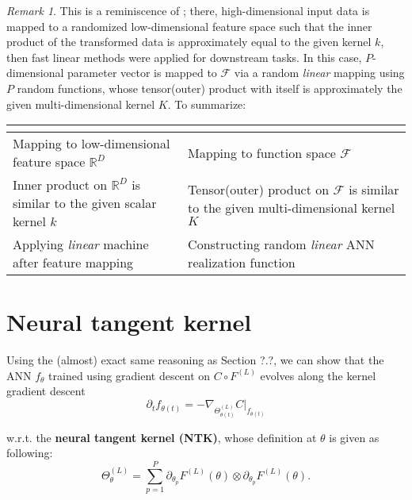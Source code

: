 \documentclass{article}
\theoremstyle{plain}
\theoremstyle{definition}
\theoremstyle{remark}
\newtheorem{remark}{Remark}
\begin{document}
\begin{remark}
	This is a reminiscence of \cite{Rahimi-Recht}; there, high-dimensional input data is mapped to a randomized low-dimensional feature space such that the inner product of the transformed data is approximately equal to the given kernel $k$, then fast linear methods were applied for downstream tasks.
	In this case, $P$-dimensional parameter vector is mapped to $\mathcal{F}$ via a random {\it linear} mapping using $P$ random functions, whose tensor(outer) product with itself is approximately the given multi-dimensional kernel $K$.
	To summarize:
	\begin{center}
		\begin{tabular}{ | p{8cm} | p{8cm} |}
			\hline
			\cite{Rahimi-Recht} & \cite{NTK} \\ \hline
			Mapping to low-dimensional feature space $\mathbb{R}^D$ & Mapping to function space $\mathcal{F}$ \\ \hline
			Inner product on $\mathbb{R}^D$ is similar to the given scalar kernel $k$ & Tensor(outer) product on $\mathcal{F}$ is similar to the given multi-dimensional kernel $K$ \\ \hline
			Applying {\it linear} machine after feature mapping & Constructing random {\it linear} ANN realization function \\
			\hline
		\end{tabular}
	\end{center}
	
\end{remark}


\section{Neural tangent kernel}
Using the (almost) exact same reasoning as Section ?.?, we can show that the ANN $f_\theta$ trained using gradient descent on $C \circ F^{(L)}$ evolves along the kernel gradient descent
\begin{equation}
	\partial_t f_{\theta(t)} = -\nabla_{\Theta^{(L)}_{\theta(t)}} C \rvert_{f_{\theta(t)}}
\end{equation}

w.r.t. the {\bf neural tangent kernel (NTK)}, whose definition at $\theta$ is given as following:
\begin{equation}
	\Theta^{(L)}_{\theta} = \sum_{p=1}^P \partial_{\theta_p} F^{(L)}(\theta) \otimes \partial_{\theta_p} F^{(L)}(\theta).
\end{equation}
\end{document}
